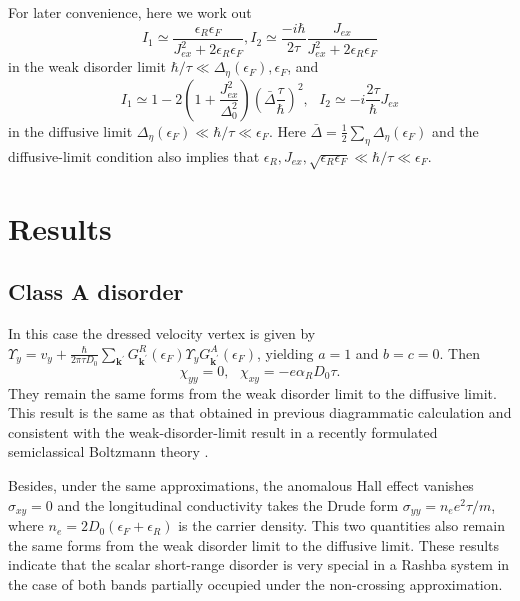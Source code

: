 \documentclass
[aps,pra,amsfonts,amssymb,twocolumn,amsmath,preprintnumbers,nofootinbib,floatfix,
showpacs,superscriptaddress]{revtex4-1}%
\begin{document}
For later convenience, here we work out
\begin{equation}
I_{1}\simeq\frac{\epsilon_{R}\epsilon_{F}}{J_{ex}^{2}+2\epsilon_{R}%
\epsilon_{F}},I_{2}\simeq\frac{-i\hbar}{2\tau}\frac{J_{ex}}{J_{ex}%
^{2}+2\epsilon_{R}\epsilon_{F}} \label{I Boltzmann}%
\end{equation}
in the weak disorder limit $\hbar/\tau\ll\Delta_{\eta}\left(  \epsilon
_{F}\right)  ,\epsilon_{F}$, and
\begin{equation}
I_{1}\simeq1-2\left(  1+\frac{J_{ex}^{2}}{\Delta_{0}^{2}}\right)  \left(
\bar{\Delta}\frac{\tau}{\hbar}\right)  ^{2},\text{ }I_{2}\simeq-i\frac{2\tau
}{\hbar}J_{ex} \label{I diffusive}%
\end{equation}
in the diffusive limit $\Delta_{\eta}\left(  \epsilon_{F}\right)  \ll
\hbar/\tau\ll\epsilon_{F}$. Here $\bar{\Delta}=\frac{1}{2}\sum_{\eta}%
\Delta_{\eta}\left(  \epsilon_{F}\right)  $ and the diffusive-limit condition
also implies that $\epsilon_{R},J_{ex},\sqrt{\epsilon_{R}\epsilon_{F}}\ll
\hbar/\tau\ll\epsilon_{F}$.

\section{Results}

\subsection{Class A disorder}

In this case the dressed velocity vertex is given by $\Upsilon_{y}=v_{y}%
+\frac{\hbar}{2\pi\tau D_{0}}\sum_{\mathbf{k}^{\prime}}G_{\mathbf{k}^{\prime}%
}^{R}\left(  \epsilon_{F}\right)  \Upsilon_{y}G_{\mathbf{k}^{\prime}}%
^{A}\left(  \epsilon_{F}\right)  $, yielding $a=1$ and $b=c=0$. Then%
\begin{equation}
\chi_{yy}=0,\text{ }\chi_{xy}=-e\alpha_{R}D_{0}\tau. \label{SOT A}%
\end{equation}
They remain the same forms from the weak disorder limit to the diffusive
limit. This result is the same as that obtained in previous diagrammatic
calculation \cite{Titov2017} and consistent with the weak-disorder-limit
result in a recently formulated semiclassical Boltzmann theory
\cite{Xiao2017SOT}.

Besides, under the same approximations, the anomalous Hall effect vanishes
$\sigma_{xy}=0$ and the longitudinal conductivity takes the Drude form
$\sigma_{yy}=n_{e}e^{2}\tau/m$, where $n_{e}=2D_{0}\left(  \epsilon
_{F}+\epsilon_{R}\right)  $ is the carrier density. This two quantities also
remain the same forms from the weak disorder limit to the diffusive limit.
These results indicate that the scalar short-range disorder is very special in
a Rashba system in the case of both bands partially occupied under the
non-crossing approximation.
\end{document}
